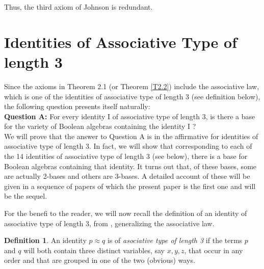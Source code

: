 \documentclass{amsart}
\theoremstyle{plain}
\theoremstyle{problem}
\theoremstyle{definition}
\newtheorem{definition}[theorem]{Definition}
\theoremstyle{remark}
\numberwithin{equation}{section}
\begin{document}
Thus, the third axiom of Johnson is redundant.


\vspace{1cm}

\section{Identities of Associative Type of length 3}

\medskip
\vspace{.5pt}
\par
Since the axioms in Theorem 2.1 (or Theorem \ref{T2.2}) include the associative law, which is one of the identities of associative type of length 3 (see definition below), the following question presents itself naturally:\\



{\bf Question A:} For every identity I of associative type of length 3, is there a base for the variety of Boolean algebras containing the identity I ? \\  

We will prove that the answer to Question A is in the affirmative for identities of associative type of length 3.  In fact, we will show that corresponding to each of the 14 identities of associative type of length 3 (see below), there is a base for Boolean algebras containing that identity. It turns out that, 
of these bases, some are actually 2-bases and others are 3-bases. 
A detailed account of these will be given in a sequence of papers of which the present paper is the first one and \cite{Sa24} will be the sequel. %

For the benefi to the reader, we will now recall the definition of an identity of associative type of length 3, 
from \cite{CoSa18}, generalizing the associative law. 

\begin{definition} 
An identity $p \approx q$ is of {\it asociative type of length 3} if the terms $p$ and $q$ will both contain three distinct variables, say $x,y,z$, that occur in any order and that are grouped in one of the two (obvious) ways.  
\end{definition}
\end{document}
